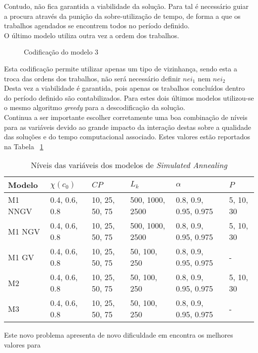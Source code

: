 Contudo, não fica garantida a viabilidade da solução. Para tal é necessário guiar a procura através da punição da sobre-utilização de tempo, de forma a que os trabalhos agendados se encontrem todos no período definido.\\

O último modelo utiliza outra vez a ordem dos trabalhos.\\

\begin{figure}[h]
    \centering
    \makebox[\textwidth][c]{%
        \texttt{[image: P2M3]}
    }
    \caption{Codificação do modelo $3$}
    \label{fig:cod_prob2_mod3}
\end{figure}

Esta codificação permite utilizar apenas um tipo de vizinhança, sendo esta a troca das ordens dos trabalhos, não será necessário definir $nei_1$ nem $nei_2$\\

Desta vez a viabilidade é garantida, pois apenas os trabalhos concluídos dentro do período definido são contabilizados. Para estes dois últimos modelos utilizou-se o mesmo algoritmo \textit{greedy} para a descodificação da solução.\\

Continua a ser importante escolher corretamente uma boa combinação de níveis para as variáveis devido ao grande impacto da interação destas sobre a qualidade das soluções e do tempo computacional associado. Estes valores estão reportados na Tabela ~\ref{tab:niveis_P2}\\

\begin{table}[H]
\caption{Níveis das variáveis dos modelos de \textit{Simulated Annealing}}
\label{tab:niveis_P2}
\begin{tabular}{llllll}
\hline
Modelo  & $\chi(c_{0})$ & $CP$           & $L_{k}$         & $\alpha$              & $P$       \\ \hline
M1 NNGV & 0.4, 0.6, 0.8 & 10, 25, 50, 75 & 500, 1000, 2500 & 0.8, 0.9, 0.95, 0.975 & 5, 10, 30 \\
M1 NGV  & 0.4, 0.6, 0.8 & 10, 25, 50, 75 & 500, 1000, 2500 & 0.8, 0.9, 0.95, 0.975 & 5, 10, 30 \\
M1 GV   & 0.4, 0.6, 0.8 & 10, 25, 50, 75 & 50, 100, 250    & 0.8, 0.9, 0.95, 0.975 & -         \\
M2      & 0.4, 0.6, 0.8 & 10, 25, 50, 75 & 50, 100, 250    & 0.8, 0.9, 0.95, 0.975 & 5, 10, 30 \\
M3      & 0.4, 0.6, 0.8 & 10, 25, 50, 75 & 50, 100, 250    & 0.8, 0.9, 0.95, 0.975 & -       
\end{tabular}
\end{table}

Este novo problema apresenta de novo dificuldade em encontra os melhores valores para





